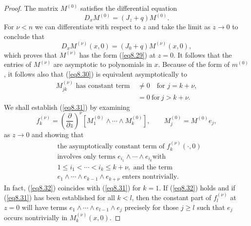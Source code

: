 \documentclass{surv-l}
\theoremstyle{plain}
\theoremstyle{definition}
\numberwithin{equation}{chapter}
\begin{document}
\begin{proof}
The matrix $M^{(0)}$ satisfies the differential equation
\begin{equation*}
D_{x}M^{(0)}=(J_{z}+q)M^{(0)}.
\end{equation*}
For $\nu <n$ we can differentiate with respect to $z$ and take the limit as $z\rightarrow 0$ to conclude that
\begin{equation*}
D_{x}M^{(\nu)}(x, 0)=(J_{0}+q)M^{(\nu)}(x, 0),
\end{equation*}
which proves that $M^{(\nu)}$ has the form (\ref{eq8.29}) at $z=0$. It follows that the entries of $M^{(\nu)}$ are asymptotic to polynomials in $x$. Because of the form of $m^{(0)}$, it follows also that (\ref{eq8.30}) is equivalent asymptotically to
\begin{align}\label{eq8.31}
M_{jk}^{(\nu)}\text{ has constant term }&\neq 0\quad \text{for } j = k+\nu,\\
&=0\ \mathrm{for}\ j > k + \nu.\nonumber
\end{align}
We shall establish (\ref{eq8.31}) by examining
\begin{equation*}
f_{k}^{(\nu)}=\left(\frac{\partial}{\partial z}\right)^{\nu}[M_{1}^{(0)}\wedge\cdots \wedge M_{k}^{(0)}],\qquad M_{j}^{(0)}=M^{(0)}e_{j},
\end{equation*}
as $z\rightarrow 0$ and showing that
\begin{align}\label{eq8.32}
\nonumber&\text{the asymptotically constant term of } f_{k}^{(\nu)}(\cdot, 0)\\
\nonumber&\text{involves only terms }  e_{i_{1}}\wedge\cdots\wedge e_{i_{k}} \mathrm{with}\\
\nonumber&1\leq i_{1}< \cdots <i_{k}\leq k+\nu, \text{ and the term}\\
& e_{1}\wedge\cdots \wedge e_{k-1}\wedge e_{k+\nu} \text{ enters nontrivially}.
\end{align}
In fact, (\ref{eq8.32}) coincides with (\ref{eq8.31}) for $k=1$. If (\ref{eq8.32}) holds and if (\ref{eq8.31}) has been established for all $k<l$, then the constant part of $f_{l}^{(\nu)}$ at $z=0$ will have terms $e_{1}\wedge\cdots \wedge e_{l-1}\wedge e_{j}$ precisely for those $j\geq l$ such that $e_{j}$ occurs nontrivially in $M_{k}^{(\nu)}(x,0)$.


\end{proof}
\end{document}
